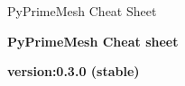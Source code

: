 \documentclass[9pt,landscape]{article}
\begin{document}
\raggedright
\footnotesize

PyPrimeMesh Cheat Sheet

\begin{center}
     \Huge{\textbf{PyPrimeMesh Cheat sheet}} \\
\end{center}
\begin{center}
  \small{\textbf{version:0.3.0 (stable)}} \\
\end{center}
\vspace{-0.15cm}
\noindent\makebox[\linewidth]{\rule{\paperwidth}{2pt}}
\end{document}
